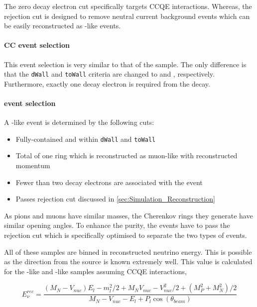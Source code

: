 The zero decay electron cut specifically targets CCQE interactions. Whereas, the  rejection cut is designed to remove neutral current  background events which can be easily reconstructed as -like events.

\paragraph{CC\quickmath{1\pi^{+}} event selection} This event selection is very similar to that of the  sample. The only difference is that the \texttt{dWall} and \texttt{toWall} criteria are changed to  and , respectively. Furthermore, exactly one decay electron is required from the \quickmath{\pi^{+}} decay. 

\paragraph{ event selection}

A -like event is determined by the following cuts:

\begin{itemize}
\item Fully-contained and within \texttt{dWall}  and \texttt{toWall} 
\item Total of one ring which is reconstructed as muon-like with reconstructed momentum 
\item Fewer than two decay electrons are associated with the event
\item Passes \quickmath{\pi^{+}} rejection cut discussed in \autoref{sec:Simulation_Reconstruction}
\end{itemize}

As pions and muons have similar masses, the Cherenkov rings they generate have similar opening angles. To enhance the purity, the events have to pass the \quickmath{\pi^{+}} rejection cut which is specifically optimised to separate the two types of events.

All of these samples are binned in reconstructed neutrino energy. This is possible as the direction from the source is known extremely well. This value is calculated for the -like and -like samples assuming CCQE interactions,

\begin{equation}
  \label{sec:SelsAndSysts_Erec_CCQE}
  E^{rec}_{\nu} = \frac{(M_{N}-V_{nuc})E_{l} - m_{l}^{2}/2 + M_{N}V_{nuc} - V_{nuc}^{2}/2 + (M_{P}^{2} + M_{N}^{2})/2}{M_{N} - V_{nuc} - E_{l} + P_{l}\cos(\theta_{beam})}
\end{equation}

